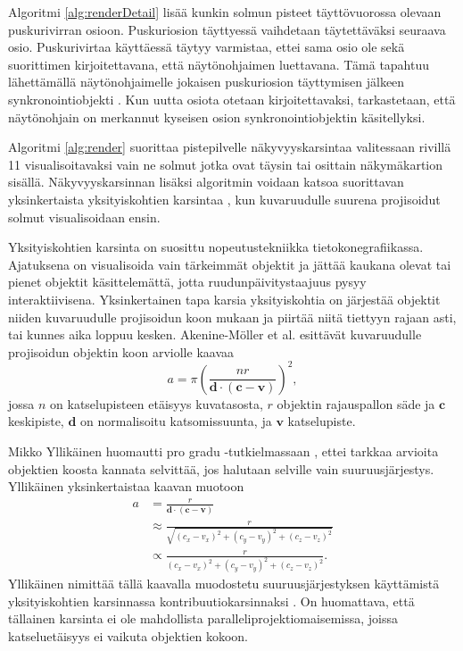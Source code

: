Algoritmi \ref{alg:renderDetail} lisää kunkin solmun pisteet täyttövuorossa olevaan puskurivirran osioon. Puskuriosion täyttyessä vaihdetaan täytettäväksi seuraava osio. Puskurivirtaa käyttäessä täytyy varmistaa, ettei sama osio ole sekä suorittimen kirjoitettavana, että näytönohjaimen luettavana. Tämä tapahtuu lähettämällä näytönohjaimelle jokaisen puskuriosion täyttymisen jälkeen synkronointiobjekti . Kun uutta osiota otetaan kirjoitettavaksi, tarkastetaan, että näytönohjain on merkannut kyseisen osion synkronointiobjektin käsitellyksi. \cite{sync}

Algoritmi \ref{alg:render} suorittaa pistepilvelle näkyvyyskarsintaa  valitessaan rivillä 11 visualisoitavaksi vain ne solmut jotka ovat täysin tai osittain näkymäkartion  sisällä. Näkyvyyskarsinnan lisäksi algoritmin voidaan katsoa suorittavan yksinkertaista yksityiskohtien karsintaa , kun kuvaruudulle suurena projisoidut solmut visualisoidaan ensin.

Yksityiskohtien karsinta on suosittu nopeutustekniikka tietokonegrafiikassa. Ajatuksena on visualisoida vain tärkeimmät objektit ja jättää kaukana olevat tai pienet objektit käsittelemättä, jotta ruudunpäivitystaajuus pysyy interaktiivisena. Yksinkertainen tapa karsia yksityiskohtia on järjestää objektit niiden kuvaruudulle projisoidun koon mukaan ja piirtää niitä tiettyyn rajaan asti, tai kunnes aika loppuu kesken. Akenine-Möller et al. \cite{rrr} esittävät kuvaruudulle projisoidun objektin koon arviolle kaavaa 
\begin{equation}
    a = \pi (\frac{nr}{\mathbf{d} \cdot (\mathbf{c}-\mathbf{v})})^2,
\end{equation} jossa $n$ on katselupisteen etäisyys kuvatasosta, $r$ objektin rajauspallon säde ja $\mathbf{c}$ keskipiste, $\mathbf{d}$ on normalisoitu katsomissuunta, ja $\mathbf{v}$ katselupiste. \cite{mikko}

Mikko Yllikäinen huomautti pro gradu -tutkielmassaan \cite{mikko}, ettei tarkkaa arvioita objektien koosta kannata selvittää, jos halutaan selville vain suuruusjärjestys. Yllikäinen yksinkertaistaa kaavan muotoon 
\begin{equation}
    \begin{split}
    a & = \frac{r}{\mathbf{d} \cdot ( \mathbf{c} - \mathbf{v} )}\\
    & \approx \frac{r}{\sqrt{(c_x-v_x)^2 + (c_y-v_y)^2 + (c_z - v_z)^2}}\\
    & \propto \frac{r}{(c_x-v_x)^2 + (c_y-v_y)^2 + (c_z - v_z)^2}.    
    \end{split}
\end{equation}
 Yllikäinen nimittää tällä kaavalla muodostetu suuruusjärjestyksen käyttämistä yksityiskohtien karsinnassa kontribuutiokarsinnaksi . On huomattava, että tällainen karsinta ei ole mahdollista paralleliprojektiomaisemissa, joissa katseluetäisyys ei vaikuta objektien kokoon. \cite{mikko}


